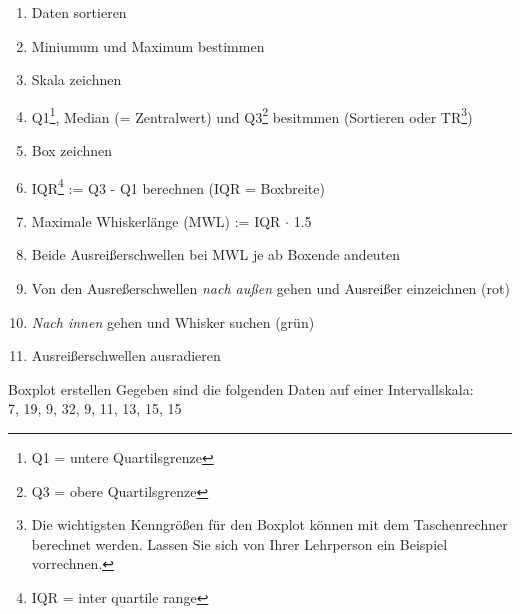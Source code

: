 \begin{rezept}{}{}
  \begin{enumerate}
    \item Daten sortieren
  \item Miniumum und Maximum bestimmen
  \item Skala zeichnen
  \item Q1\footnote{Q1 = untere Quartilsgrenze},
    Median (= Zentralwert) und Q3\footnote{Q3 = obere Quartilsgrenze} besitmmen (Sortieren
    oder TR\footnote{Die wichtigsten Kenngrößen für den Boxplot können mit dem Taschenrechner berechnet werden. Lassen Sie sich von Ihrer Lehrperson ein Beispiel vorrechnen.})
  \item Box zeichnen
  \item IQR\footnote{IQR = inter quartile range} := Q3 - Q1
    berechnen (IQR = Boxbreite)
    \item Maximale Whiskerlänge (MWL) := IQR $\cdot{}$ 1.5
  \item Beide Ausreißerschwellen bei MWL je ab Boxende andeuten
  \item Von den Ausreßerschwellen \textit{nach außen} gehen und
    Ausreißer einzeichnen (rot)
  \item \textit{Nach innen} gehen und Whisker suchen (grün)
  \item Ausreißerschwellen ausradieren
  \end{enumerate}
\end{rezept}
\newpage

\begin{beispiel}{Boxplot erstellen}{}
  Gegeben sind die folgenden Daten auf einer Intervallskala:\\
  7, 19, 9, 32, 9, 11, 13, 15, 15
\end{beispiel}

